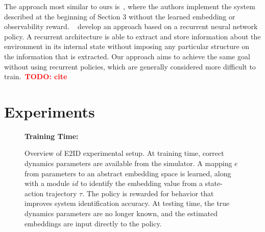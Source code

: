 \documentclass{article}
\newcommand{\TODO}[1]{\textcolor{red}{\textbf{TODO: #1}}}
\newcommand{\embedfn}{e}
\newcommand{\idfn}{id}
\begin{document}
%
The approach most similar to ours is~\citet{yu-up-osi-rss17},
where the authors implement the system described at the beginning of Section 3 without the learned embedding or observability reward.
~\citet{peng-dynamics-randomization-corr17} develop an approach based on a recurrent neural network policy.
A recurrent architecture is able to extract and store information about the environment in its internal state without imposing any particular structure on the information that is extracted.
Our approach aims to achieve the same goal without using recurrent policies, which are generally considered more difficult to train.~\TODO{cite}



\section{Experiments}

\begin{figure}[ht]
\centering
\textbf{Training Time:}

\vspace{0.4cm}

\vspace{0.4cm}
\caption{
Overview of E2ID experimental setup.
At training time, correct dynamics parameters are available from the simulator.
A mapping $\embedfn$ from parameters to an abstract embedding space is learned,
along with a module $\idfn$ to identify the embedding value from a state-action trajectory $\tau$.
The policy is rewarded for behavior that improves system identification accuracy.
At testing time, the true dynamics parameters are no longer known,
and the estimated embeddings are input directly to the policy.
}
\label{fig:overview}
\end{figure}
\end{document}
